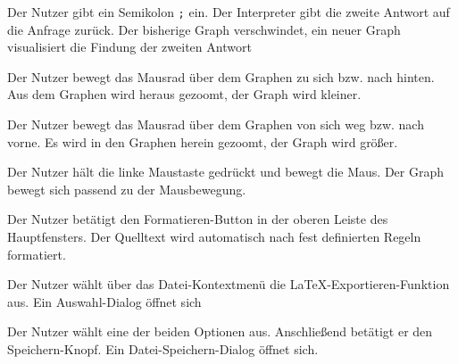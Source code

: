 \documentclass[parskip=full,11pt,twoside]{scrartcl}
\begin{document}
{Der Nutzer gibt ein Semikolon \texttt{;} ein.}
{Der Interpreter gibt die zweite Antwort auf die Anfrage zurück. Der bisherige Graph verschwindet, ein neuer Graph visualisiert die Findung der zweiten Antwort}



{Der Nutzer bewegt das Mausrad über dem Graphen zu sich bzw. nach hinten.}
{Aus dem Graphen wird heraus gezoomt, der Graph wird kleiner.}

{Der Nutzer bewegt das Mausrad über dem Graphen von sich weg bzw. nach vorne.}
{Es wird in den Graphen herein gezoomt, der Graph wird größer.}

{Der Nutzer hält die linke Maustaste gedrückt und bewegt die Maus.}
{Der Graph bewegt sich passend zu der Mausbewegung.}



{Der Nutzer betätigt den Formatieren-Button in der oberen Leiste des Hauptfensters.}
{Der Quelltext wird automatisch nach fest definierten Regeln formatiert.}



{Der Nutzer wählt über das Datei-Kontextmenü die LaTeX-Exportieren-Funktion aus.}
{Ein Auswahl-Dialog öffnet sich}

{Der Nutzer wählt eine der beiden Optionen aus. Anschließend betätigt er den Speichern-Knopf.}
{Ein Datei-Speichern-Dialog öffnet sich.}
\end{document}
